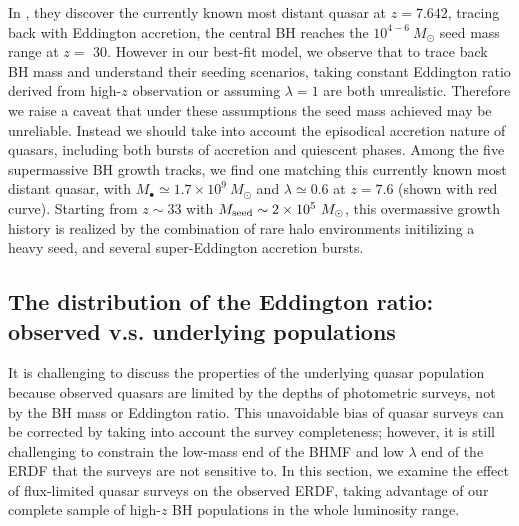\documentclass[twocolumn, twocolappendix]{aastex63}
\newcommand{\Msun}{M_\odot}
\newcommand{\red}[1]{\textcolor{red}{ #1}}
\begin{document}
\begin{CJK*}{UTF8}{gbsn}
In \citet{2021ApJ...907L...1W}, they discover the currently known most distant quasar at $z=7.642$, 
tracing back with Eddington accretion, the central BH reaches the $10^{4-6}~\Msun$ seed mass range at $z=$ 30. 
However in our best-fit model, we observe that to trace back BH mass and understand their seeding scenarios, 
taking constant Eddington ratio derived from high-$z$ observation or assuming $\lambda=1$ are both unrealistic. 
Therefore we raise a caveat that under these assumptions the seed mass achieved may be unreliable. 
Instead we should take into account the episodical accretion nature of quasars, 
including both bursts of accretion and quiescent phases.
Among the five supermassive BH growth tracks,
we find one matching this currently known most distant quasar, 
with $M_\bullet \simeq 1.7\times 10^9~\Msun$ and $\lambda \simeq 0.6$ at $z=7.6$ (shown with red curve).
Starting from $z\sim 33$ with $M_{\rm seed} \sim 2\times 10^5~\Msun$,
this overmassive growth history is realized by the combination of rare halo environments initilizing a heavy seed, 
and several super-Eddington accretion bursts.




\vspace{2mm}
\subsection{The distribution of the Eddington ratio: \\observed v.s. underlying populations}\label{sec:ldist}

It is challenging to discuss the properties of the underlying quasar population
because observed quasars are limited by the depths of photometric surveys, not by the BH mass or Eddington ratio.
This unavoidable bias of quasar surveys can be corrected by taking into account the survey completeness;
however, it is still challenging to constrain the low-mass end of the BHMF and low $\lambda$ end of the ERDF
that the surveys are not sensitive to.
In this section, we examine the effect of flux-limited quasar surveys on the observed ERDF, 
taking advantage of our complete sample of high-$z$ BH populations in the whole luminosity range. 



\end{CJK*}
\end{document}
